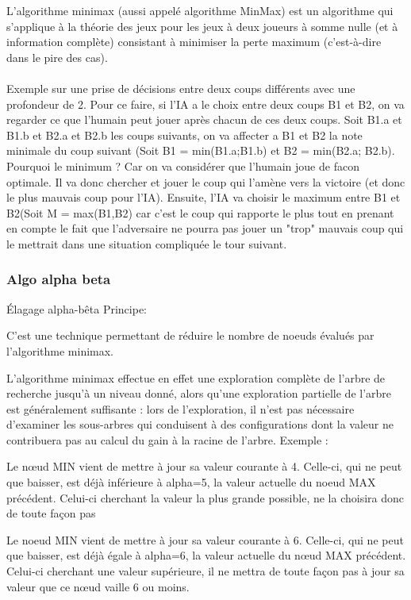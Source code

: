 \documentclass[a4]{article}
\begin{document}
L'algorithme minimax (aussi appelé algorithme MinMax) est un algorithme qui s'applique
 à la théorie des jeux pour les jeux à deux joueurs à somme nulle (et à information complète)
  consistant à minimiser la perte maximum (c'est-à-dire dans le pire des cas). \\ \\


Exemple sur une prise de décisions entre deux coups différents avec une profondeur de 2.
Pour ce faire, si l'IA a le choix entre deux coups B1 et B2, on va regarder ce que l'humain peut jouer
après chacun de ces deux coups. Soit B1.a et B1.b et B2.a et B2.b les coups suivants, on va affecter a B1
 et B2 la note minimale
du coup suivant (Soit B1 = min(B1.a;B1.b) et B2 = min(B2.a; B2.b). Pourquoi le minimum ? Car on va considérer que 
l'humain joue de facon optimale. Il va donc chercher et jouer le coup qui l'amène vers la victoire (et donc le plus mauvais 
coup pour l'IA).
Ensuite, l'IA va choisir le maximum entre B1 et B2(Soit M = max(B1,B2) car c'est le coup qui rapporte le plus tout en prenant
en compte le
fait que l'adversaire ne pourra pas jouer un "trop" mauvais coup qui le mettrait dans une situation compliquée le tour
suivant.
											\subsubsection{Algo alpha beta}
Élagage alpha-bêta
Principe:

C'est une technique permettant de réduire le nombre de noeuds évalués par l'algorithme minimax.

L'algorithme minimax effectue en effet une exploration complète de l'arbre de recherche jusqu'à un niveau donné,
alors qu'une exploration partielle de l'arbre est généralement suffisante : lors de l'exploration, il n'est pas nécessaire
d'examiner les sous-arbres qui conduisent à des configurations dont la valeur ne contribuera pas au calcul du gain
à la racine de l'arbre.
Exemple :
										
										
Le nœud MIN vient de mettre à jour sa valeur courante à 4. Celle-ci, 
qui ne peut que baisser, est déjà inférieure à alpha=5, la valeur actuelle du noeud MAX précédent.
 Celui-ci cherchant la valeur la plus grande possible, ne la choisira donc de toute façon pas
 
 Le noeud MIN vient de mettre à jour sa valeur courante à 6. Celle-ci, qui ne peut que baisser, est déjà égale à alpha=6, la valeur
  actuelle du nœud MAX précédent. Celui-ci cherchant une valeur supérieure, il ne mettra de toute façon pas à jour sa valeur
   que ce nœud vaille 6 ou moins.
	
\end{document}
